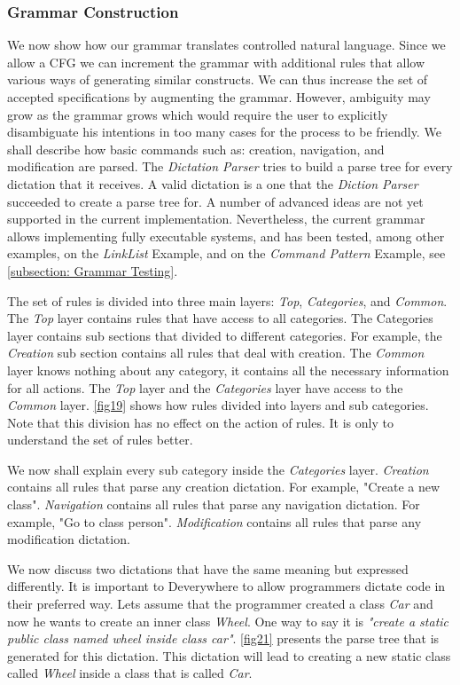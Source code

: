 \subsubsection{Grammar Construction}
We now show how our grammar translates controlled natural language. Since we allow a CFG we can increment the grammar with additional rules that allow various ways of generating similar constructs. We can thus increase the set of accepted specifications by augmenting the grammar. However, ambiguity may grow as the grammar grows which would require the user to explicitly disambiguate his intentions in too many cases for the process to be friendly. We shall describe how basic commands such as: creation, navigation, and modification are parsed. The \textit{Dictation Parser} tries to build a parse tree for every dictation that it receives. A valid dictation is a one that the \textit{Diction Parser} succeeded to create a parse tree for. A number of advanced ideas are not yet supported in the current implementation. Nevertheless, the current grammar allows implementing fully executable systems, and has been tested, among other examples, on the \textit{LinkList} Example, and on the \textit{Command Pattern} Example, see \ref{subsection: Grammar Testing}.

The set of rules is divided into three main layers: \textit{Top}, \textit{Categories}, and \textit{Common}. The \textit{Top} layer contains rules that have access to all categories. The Categories layer contains sub sections that divided to different categories. For example, the \textit{Creation} sub section contains all rules that deal with creation. The \textit{Common} layer knows nothing about any category, it contains all the necessary information for all actions. The \textit{Top} layer and the \textit{Categories} layer have access to the \textit{Common} layer. \autoref{fig19} shows how rules divided into layers and sub categories. Note that this division has no effect on the action of rules. It is only to understand the set of rules better.

We now shall explain every sub category inside the \textit{Categories} layer. \textit{Creation} contains all rules that parse any creation dictation. For example, "Create a new class". \textit{Navigation} contains all rules that parse any navigation dictation. For example, "Go to class person". \textit{Modification} contains all rules that parse any modification dictation.

We now discuss two dictations that have the same meaning but expressed differently. It is important to Deverywhere to allow programmers dictate code in their preferred way. Lets assume that the programmer created a class \textit{Car} and now he wants to create an inner class \textit{Wheel}. One way to say it is \textit{"create a static public class named wheel inside class car"}. \autoref{fig21} presents the parse tree that is generated for this dictation. This dictation will lead to creating a new  static class called \textit{Wheel} inside a class that is called \textit{Car}.


